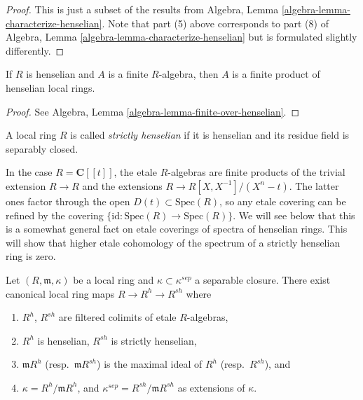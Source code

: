 \begin{proof}
This is just a subset of the results from
Algebra, Lemma \ref{algebra-lemma-characterize-henselian}.
Note that part (5) above corresponds to part (8) of
Algebra, Lemma \ref{algebra-lemma-characterize-henselian}
but is formulated slightly differently.
\end{proof}

\begin{lemma}
\label{lemma-finite-over-henselian}
If $R$ is henselian and $A$ is a finite $R$-algebra, then $A$ is a finite
product of henselian local rings.
\end{lemma}

\begin{proof}
See
Algebra, Lemma \ref{algebra-lemma-finite-over-henselian}.
\end{proof}

\begin{definition}
\label{definition-strictly-henselian}
A local ring $R$ is called {\it strictly henselian} if it is henselian and its
residue field is separably closed.
\end{definition}

\begin{example}
\label{example-powerseries}
In the case $R = \mathbf{C}[[t]]$, the etale $R$-algebras are finite products
of the trivial extension $R \to R$ and the extensions
$R \to R[X, X^{-1}]/(X^n-t)$.
The latter ones factor through the open $D(t) \subset \text{Spec}(R)$, so any
etale covering can be refined by the covering
$\{\text{id} : \text{Spec}(R) \to \text{Spec}(R)\}$. We will see below that
this is a somewhat general fact on etale coverings of spectra of henselian
rings. This will show that higher etale cohomology of the spectrum of a
strictly henselian ring is zero.
\end{example}

\begin{theorem}
\label{theorem-henselization}
Let $(R, \mathfrak m, \kappa)$ be a local ring and
$\kappa\subset\kappa^{sep}$ a separable closure. There exist canonical local
ring maps $R \to R^h \to R^{sh}$ where
\begin{enumerate}
\item $R^h$, $R^{sh}$ are filtered colimits of etale $R$-algebras,
\item $R^h$ is henselian, $R^{sh}$ is strictly henselian,
\item $\mathfrak m R^h$ (resp.\ $\mathfrak m R^{sh}$) is the
maximal ideal of $R^h$ (resp.\ $R^{sh}$), and
\item $\kappa = R^h/\mathfrak m R^h$, and
$\kappa^{sep} = R^{sh}/\mathfrak m R^{sh}$ as extensions of $\kappa$.
\end{enumerate}
\end{theorem}

